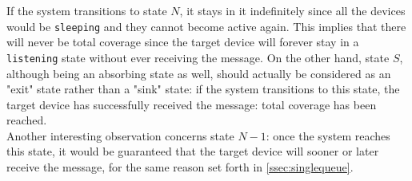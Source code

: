 If the system transitions to state $N$, it stays in it indefinitely since all
the devices would be \texttt{sleeping} and they cannot become active again. This
implies that there will never be total coverage since the target device will
forever stay in a \texttt{listening} state without ever receiving the message.
On the other hand, state $S$, although being an absorbing state as well, should
actually be considered as an "exit" state rather than a "sink" state: if the
system transitions to this state, the target device has successfully received
the message: total coverage has been reached.\\
Another interesting observation concerns state $N - 1$: once the system reaches
this state, it would be guaranteed that the target device will sooner or later
receive the message, for the same reason set forth in \ref{ssec:singlequeue}.
